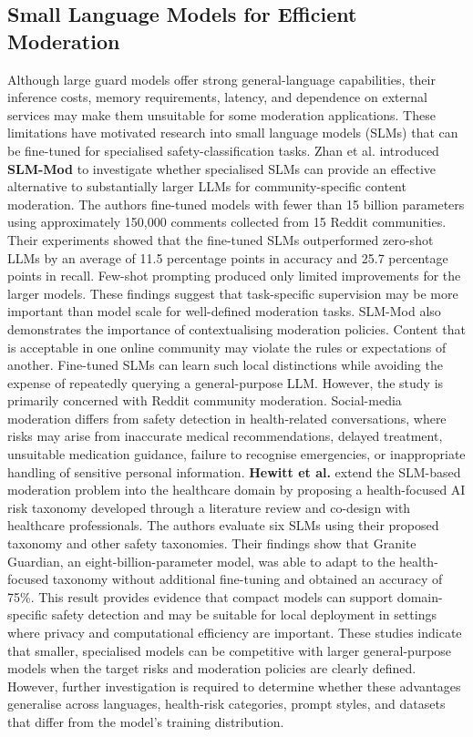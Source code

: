 \documentclass[11pt,a4paper]{article}
\begin{document}
\subsection{Small Language Models for Efficient Moderation}
Although large guard models offer strong general-language capabilities, their inference costs, memory requirements, latency, and dependence on external services may make them unsuitable for some moderation applications. These limitations have motivated research into small language models (SLMs) that can be fine-tuned for specialised safety-classification tasks.
Zhan et al. introduced \textbf{SLM-Mod} \cite{zhan2024slmmod} to investigate whether specialised SLMs can provide an effective alternative to substantially larger LLMs for community-specific content moderation. The authors fine-tuned models with fewer than 15 billion parameters using approximately 150,000 comments collected from 15 Reddit communities. Their experiments showed that the fine-tuned SLMs outperformed zero-shot LLMs by an average of 11.5 percentage points in accuracy and 25.7 percentage points in recall. Few-shot prompting produced only limited improvements for the larger models. These findings suggest that task-specific supervision may be more important than model scale for well-defined moderation tasks.
SLM-Mod also demonstrates the importance of contextualising moderation policies. Content that is acceptable in one online community may violate the rules or expectations of another. Fine-tuned SLMs can learn such local distinctions while avoiding the expense of repeatedly querying a general-purpose LLM. However, the study is primarily concerned with Reddit community moderation. Social-media moderation differs from safety detection in health-related conversations, where risks may arise from inaccurate medical recommendations, delayed treatment, unsuitable medication guidance, failure to recognise emergencies, or inappropriate handling of sensitive personal information.
\textbf{Hewitt et al.} \cite{hewitt2025health} extend the SLM-based moderation problem into the healthcare domain by proposing a health-focused AI risk taxonomy developed through a literature review and co-design with healthcare professionals. The authors evaluate six SLMs using their proposed taxonomy and other safety taxonomies. Their findings show that Granite Guardian, an eight-billion-parameter model, was able to adapt to the health-focused taxonomy without additional fine-tuning and obtained an accuracy of 75\%. This result provides evidence that compact models can support domain-specific safety detection and may be suitable for local deployment in settings where privacy and computational efficiency are important.
These studies indicate that smaller, specialised models can be competitive with larger general-purpose models when the target risks and moderation policies are clearly defined. However, further investigation is required to determine whether these advantages generalise across languages, health-risk categories, prompt styles, and datasets that differ from the model’s training distribution.
\end{document}
